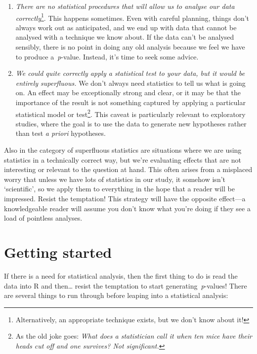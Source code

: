 \documentclass[
]{book}
\begin{document}
\begin{enumerate}
\def\labelenumi{\arabic{enumi}.}
\item
  \emph{There are no statistical procedures that will allow us to analyse our data correctly}\footnote{Alternatively, an appropriate technique exists, but we don't know about it!}. This happens sometimes. Even with careful planning, things don't always work out as anticipated, and we end up with data that cannot be analysed with a technique we know about. If the data can't be analysed sensibly, there is no point in doing any old analysis because we feel we have to produce a~\emph{p}-value. Instead, it's time to seek some advice.
\item
  \emph{We could quite correctly apply a statistical test to your data, but it would be entirely superfluous.} We don't always need statistics to tell us what is going on. An effect may be exceptionally strong and clear, or it may be that the importance of the result is not something captured by applying a particular statistical model or test\footnote{As the old joke goes: \emph{What does a statistician call it when ten mice have their heads cut off and one survives? Not significant.}}. This caveat is particularly relevant to exploratory studies, where the goal is to use the data to generate new hypotheses rather than test \emph{a priori} hypotheses.
\end{enumerate}

Also in the category of superfluous statistics are situations where we are using statistics in a technically correct way, but we're evaluating effects that are not interesting or relevant to the question at hand. This often arises from a misplaced worry that unless we have lots of statistics in our study, it somehow isn't `scientific', so we apply them to everything in the hope that a reader will be impressed. Resist the temptation! This strategy will have the opposite effect---a knowledgeable reader will assume you don't know what you're doing if they see a load of pointless analyses.

\hypertarget{getting-started}{%
\section{Getting started}\label{getting-started}}

If there is a need for statistical analysis, then the first thing to do is read the data into R and then\ldots{} resist the temptation to start generating~\emph{p}-values! There are several things to run through before leaping into a statistical analysis:
\end{document}
